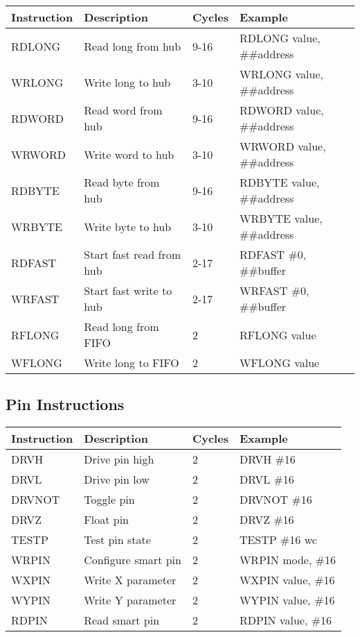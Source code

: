 \documentclass[11pt]{book}
\begin{document}
\begin{longtable}[]{@{}llll@{}}
\toprule
Instruction & Description & Cycles & Example \\
\midrule
\endhead
RDLONG & Read long from hub & 9-16 & RDLONG value, \#\#address \\
WRLONG & Write long to hub & 3-10 & WRLONG value, \#\#address \\
RDWORD & Read word from hub & 9-16 & RDWORD value, \#\#address \\
WRWORD & Write word to hub & 3-10 & WRWORD value, \#\#address \\
RDBYTE & Read byte from hub & 9-16 & RDBYTE value, \#\#address \\
WRBYTE & Write byte to hub & 3-10 & WRBYTE value, \#\#address \\
RDFAST & Start fast read from hub & 2-17 & RDFAST \#0, \#\#buffer \\
WRFAST & Start fast write to hub & 2-17 & WRFAST \#0, \#\#buffer \\
RFLONG & Read long from FIFO & 2 & RFLONG value \\
WFLONG & Write long to FIFO & 2 & WFLONG value \\
\bottomrule
\end{longtable}

\hypertarget{pin-instructions}{%
\subsection{Pin Instructions}\label{pin-instructions}}

\begin{longtable}[]{@{}llll@{}}
\toprule
Instruction & Description & Cycles & Example \\
\midrule
\endhead
DRVH & Drive pin high & 2 & DRVH \#16 \\
DRVL & Drive pin low & 2 & DRVL \#16 \\
DRVNOT & Toggle pin & 2 & DRVNOT \#16 \\
DRVZ & Float pin & 2 & DRVZ \#16 \\
TESTP & Test pin state & 2 & TESTP \#16 wc \\
WRPIN & Configure smart pin & 2 & WRPIN mode, \#16 \\
WXPIN & Write X parameter & 2 & WXPIN value, \#16 \\
WYPIN & Write Y parameter & 2 & WYPIN value, \#16 \\
RDPIN & Read smart pin & 2 & RDPIN value, \#16 \\
\bottomrule
\end{longtable}
\end{document}
